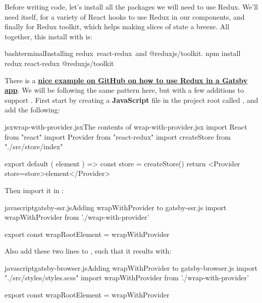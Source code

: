 \documentclass[a4paper,headinclude=on,footinclude=on,12pt,oneside]{scrbook}
\makeatletter
\newcommand{\link}[2]{\textbf{\textcolor{monokaiPink}{\href{#2}{#1}}}}
\newcommand{\at}{\makeatletter @\makeatother}
\makeatother
\begin{document}

Before writing code, let's install all the packages we will need to use Redux. We'll need  itself,  for a variety of React hooks to use Redux in our components, and finally \codeword{\at reduxjs/toolkit} for Redux toolkit, which helps making slices of state a breeze. All together, this install with  is:

\begin{codeInput}{bash}{terminal}{Installing redux\, react-redux\, and \at reduxjs/toolkit.}
npm install redux react-redux @reduxjs/toolkit
\end{codeInput}


There is a \link{nice example on GitHub on how to use Redux in a Gatsby app}{https://github.com/gatsbyjs/gatsby/tree/master/examples/using-redux}. We will be following the same pattern here, but with a few additions to support . First start by creating a \textbf{JavaScript} file in the project root called , and add the following:

\begin{codeInput}{jsx}{wrap-with-provider.jsx}{The contents of wrap-with-provider.jsx}
import React from "react"
import { Provider } from "react-redux"
import createStore from "./src/store/index"

export default ({ element }) => {
  const store = createStore()
  return <Provider store={store}>{element}</Provider>
}  
\end{codeInput}

Then import it in :

\begin{codeInput}{javascript}{gatsby-ssr.js}{Adding wrapWithProvider to gatsby-ssr.js}
import wrapWithProvider from './wrap-with-provider'

export const wrapRootElement = wrapWithProvider
\end{codeInput}

Also add these two lines to , such that it results with:

\begin{codeInput}{javascript}{gatsby-browser.js}{Adding wrapWithProvider to gatsby-browser.js}
import "./src/styles/styles.scss"
import wrapWithProvider from './wrap-with-provider'

export const wrapRootElement = wrapWithProvider
\end{codeInput}
\end{document}
